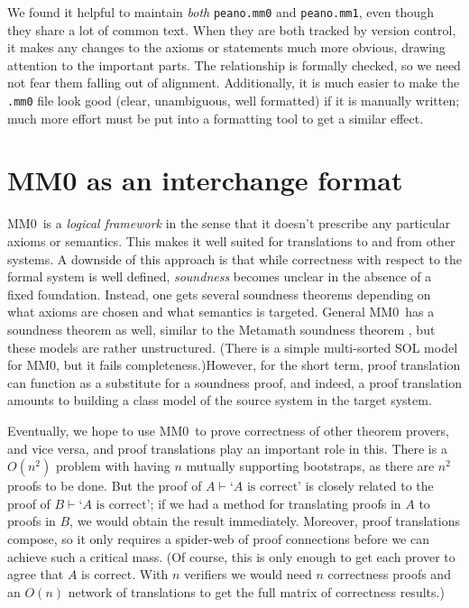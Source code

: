 \documentclass[runningheads]{llncs}
\newcommand{\mmO}{\textsf{MM0}}
\begin{document}
We found it helpful to maintain \emph{both} \texttt{peano.mm0} and \texttt{peano.mm1}, even though they share a lot of common text. When they are both tracked by version control, it makes any changes to the axioms or statements much more obvious, drawing attention to the important parts. The relationship is formally checked, so we need not fear them falling out of alignment. Additionally, it is much easier to make the \texttt{.mm0} file look good (clear, unambiguous, well formatted) if it is manually written; much more effort must be put into a formatting tool to get a similar effect.

\section{MM0 as an interchange format}\label{sec:translation}
\mmO\ is a \emph{logical framework} in the sense that it doesn't prescribe any particular axioms or semantics. This makes it well suited for translations to and from other systems. A downside of this approach is that while correctness with respect to the formal system is well defined, \emph{soundness} becomes unclear in the absence of a fixed foundation. Instead, one gets several soundness theorems depending on what axioms are chosen and what semantics is targeted. General \mmO\ has a soundness theorem as well, similar to the Metamath soundness theorem \cite{Carn16}, but these models are rather unstructured. (There is a simple multi-sorted SOL model for \mmO, but it fails completeness.)However, for the short term, proof translation can function as a substitute for a soundness proof, and indeed, a proof translation amounts to building a class model of the source system in the target system.

Eventually, we hope to use \mmO\ to prove correctness of other theorem provers, and vice versa, and proof translations play an important role in this. There is a $O(n^2)$ problem with having $n$ mutually supporting bootstraps, as there are $n^2$ proofs to be done. But the proof of $A\vdash \mbox{`$A$ is correct'}$ is closely related to the proof of $B\vdash \mbox{`$A$ is correct'}$; if we had a method for translating proofs in $A$ to proofs in $B$, we would obtain the result immediately. Moreover, proof translations compose, so it only requires a spider-web of proof connections before we can achieve such a critical mass. (Of course, this is only enough to get each prover to agree that $A$ is correct. With $n$ verifiers we would need $n$ correctness proofs and an $O(n)$ network of translations to get the full matrix of correctness results.)
\end{document}
